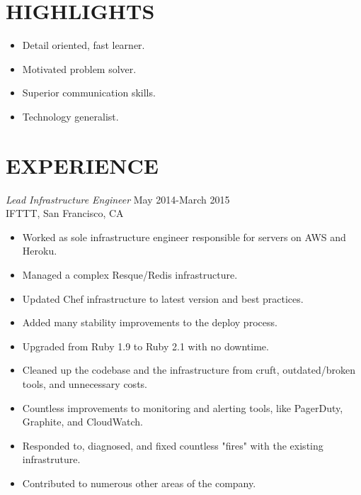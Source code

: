 \documentclass[line,margin]{res}
\begin{document}
\address{\,\,\,\,\,\,\,\,\,\,\,\,\,\,\,\,\,\,\,\,\, dana.merrick@gmail.com} %
\address{San Francisco, CA -- 978.206.1331}

\begin{resume}

\section{HIGHLIGHTS}
  \begin{itemize}  \itemsep -2pt %
    \item Detail oriented, fast learner.
    \item Motivated problem solver.
    \item Superior communication skills.
    \item Technology generalist.
  \end{itemize}

\section{EXPERIENCE}
  {\sl Lead Infrastructure Engineer}  \hfill May 2014-March 2015 \\
  IFTTT,
  San Francisco, CA
  \begin{itemize}  \itemsep -2pt %
    \item Worked as sole infrastructure engineer responsible for servers on AWS and Heroku.
    \item Managed a complex Resque/Redis infrastructure. %
    \item Updated Chef infrastructure to latest version and best practices.
    \item Added many stability improvements to the deploy process.
    \item Upgraded from Ruby 1.9 to Ruby 2.1 with no downtime.
    \item Cleaned up the codebase and the infrastructure from cruft, outdated/broken tools, and unnecessary costs.
    \item Countless improvements to monitoring and alerting tools, like PagerDuty, Graphite, and CloudWatch.
    \item Responded to, diagnosed, and fixed countless "fires" with the existing infrastruture.
    \item Contributed to numerous other areas of the company.
  \end{itemize}


\end{resume}
\end{document}
